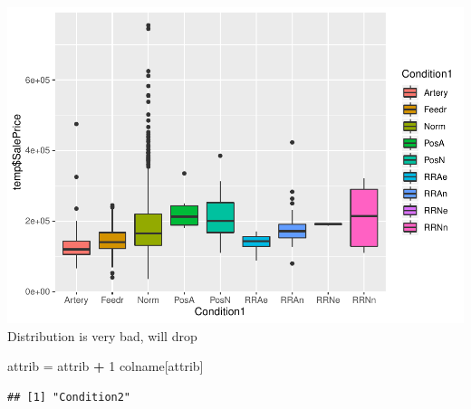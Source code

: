\documentclass[]{article}
\newenvironment{Shaded}{\begin{snugshade}}{\end{snugshade}}
\newcommand{\DecValTok}[1]{\textcolor[rgb]{0.00,0.00,0.81}{#1}}
\newcommand{\StringTok}[1]{\textcolor[rgb]{0.31,0.60,0.02}{#1}}
\newcommand{\OperatorTok}[1]{\textcolor[rgb]{0.81,0.36,0.00}{\textbf{#1}}}
\newcommand{\NormalTok}[1]{#1}
\begin{document}
\includegraphics{EDA_files/figure-latex/unnamed-chunk-36-1.pdf}
Distribution is very bad, will drop

\begin{Shaded}
\begin{Highlighting}[]
\NormalTok{attrib =}\StringTok{ }\NormalTok{attrib }\OperatorTok{+}\StringTok{ }\DecValTok{1}
\NormalTok{colname[attrib]}
\end{Highlighting}
\end{Shaded}

\begin{verbatim}
## [1] "Condition2"
\end{verbatim}
\end{document}
